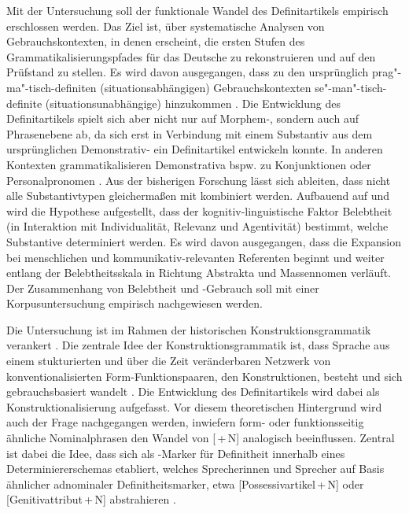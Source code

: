 Mit der Untersuchung soll der funktionale Wandel des Definitartikels empirisch erschlossen werden. Das Ziel ist, über systematische Analysen von Gebrauchskontexten, in denen  erscheint, die ersten Stufen des Grammatikalisierungspfades \parencite{Lehmann2015} für das Deutsche zu rekonstruieren und auf den Prüfstand zu stellen. Es wird davon ausgegangen, dass zu den ursprünglich prag"-ma"-tisch-definiten (situationsabhängigen) Gebrauchskontexten se"-man"-tisch-definite (situationsunabhängige) hinzukommen \parencite{Lobner1985,Himmelmann1997}. 
Die Entwicklung des Definitartikels spielt sich aber nicht nur auf  Morphem-, sondern auch auf Phrasenebene ab, da sich erst in Verbindung mit einem Substantiv aus dem ursprünglichen Demonstrativ- ein Definitartikel entwickeln konnte. In anderen Kontexten grammatikalisieren Demonstrativa bspw. zu Konjunktionen oder Personalpronomen \parencite{Diessel1999}. Aus der bisherigen Forschung \parencite[u.a.][]{Oubouzar1989,Oubouzar1992}
lässt sich ableiten, dass nicht alle Substantivtypen gleichermaßen mit  kombiniert werden. Aufbauend auf \textcite{Szczepaniak2011a} und \textcite{Enger2011} wird die Hypothese aufgestellt, dass der kognitiv-linguistische Faktor Belebtheit (in Interaktion mit Individualität, Relevanz und Agentivität) bestimmt, welche Substantive determiniert werden. Es wird davon ausgegangen, dass die Expansion bei menschlichen und kommunikativ-relevanten Referenten beginnt und weiter entlang der Belebtheitsskala in Richtung Abstrakta und Massennomen verläuft. Der Zusammenhang von Belebtheit und -Gebrauch soll mit einer Korpusuntersuchung empirisch nachgewiesen werden.  

Die Untersuchung ist im Rahmen der historischen Konstruktionsgrammatik verankert \parencite[s. u.a.][]{Traugott2003,Bergs2008,Traugott2013}. Die zentrale Idee der Konstruktionsgrammatik ist, dass Sprache aus einem stukturierten und über die Zeit veränderbaren Netzwerk von konventionalisierten Form-Funktionspaaren, den Konstruktionen, besteht und sich gebrauchsbasiert wandelt \parencite{Bybee2010,Bybee2013}. Die Entwicklung des Definitartikels wird dabei als Konstruktionalisierung aufgefasst. Vor diesem theoretischen Hintergrund wird auch der Frage nachgegangen werden, inwiefern form- oder funktionsseitig ähnliche Nominalphrasen den Wandel von [\,+\,N] analogisch beeinflussen. Zentral ist dabei die Idee, dass sich  als -Marker für Definitheit innerhalb eines Determiniererschemas etabliert, welches Sprecherinnen und Sprecher auf Basis ähnlicher adnominaler Definitheitsmarker, etwa  [Possessivartikel\,+\,N]  oder [Genitivattribut\,+\,N] abstrahieren \parencite[vgl. fürs Englische][]{Sommerer2015}.



